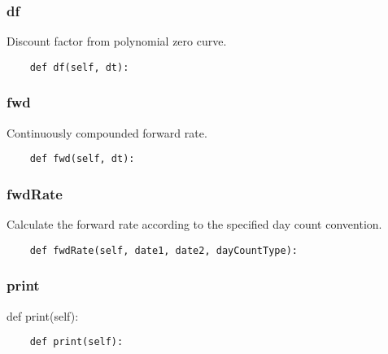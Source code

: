 \documentclass[twoside,11pt]{book}
\begin{document}
\subsubsection*{{\bf df}}
Discount factor from polynomial zero curve. 

\begin{lstlisting}
    def df(self, dt):
\end{lstlisting}

\subsubsection*{{\bf fwd}}
Continuously compounded forward rate.  

\begin{lstlisting}
    def fwd(self, dt):
\end{lstlisting}

\subsubsection*{{\bf fwdRate}}
Calculate the forward rate according to the specified day count convention.  

\begin{lstlisting}
    def fwdRate(self, date1, date2, dayCountType):
\end{lstlisting}

\subsubsection*{{\bf print}}
def print(self): 

\begin{lstlisting}
    def print(self):
\end{lstlisting}
\end{document}
